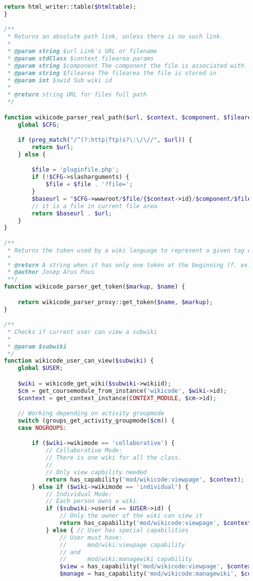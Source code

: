 \begin{lstlisting}[language=PHP]
    return html_writer::table($htmltable);
}

/**
 * Returns an absolute path link, unless there is no such link.
 *
 * @param string $url Link's URL or filename
 * @param stdClass $context filearea params
 * @param string $component The component the file is associated with
 * @param string $filearea The filearea the file is stored in
 * @param int $swid Sub wiki id
 *
 * @return string URL for files full path
 */

function wikicode_parser_real_path($url, $context, $component, $filearea, $swid) {
    global $CFG;

    if (preg_match("/^(?:http|ftp)s?\:\/\//", $url)) {
        return $url;
    } else {

        $file = 'pluginfile.php';
        if (!$CFG->slasharguments) {
            $file = $file . '?file=';
        }
        $baseurl = "$CFG->wwwroot/$file/{$context->id}/$component/$filearea/$swid/";
        // it is a file in current file area
        return $baseurl . $url;
    }
}

/**
 * Returns the token used by a wiki language to represent a given tag or "object" (bold -> **)
 *
 * @return A string when it has only one token at the beginning (f. ex. lists). An array composed by 2 strings when it has 2 tokens, one at the beginning and one at the end (f. ex. italics). Returns false otherwise.
 * @author Josep Arus Pous
 **/
function wikicode_parser_get_token($markup, $name) {

    return wikicode_parser_proxy::get_token($name, $markup);
}

/**
 * Checks if current user can view a subwiki
 *
 * @param $subwiki
 */
function wikicode_user_can_view($subwiki) {
    global $USER;

    $wiki = wikicode_get_wiki($subwiki->wikiid);
    $cm = get_coursemodule_from_instance('wikicode', $wiki->id);
    $context = get_context_instance(CONTEXT_MODULE, $cm->id);

    // Working depending on activity groupmode
    switch (groups_get_activity_groupmode($cm)) {
    case NOGROUPS:

        if ($wiki->wikimode == 'collaborative') {
            // Collaborative Mode:
            // There is one wiki for all the class.
            //
            // Only view capbility needed
            return has_capability('mod/wikicode:viewpage', $context);
        } else if ($wiki->wikimode == 'individual') {
            // Individual Mode:
            // Each person owns a wiki.
            if ($subwiki->userid == $USER->id) {
                // Only the owner of the wiki can view it
                return has_capability('mod/wikicode:viewpage', $context);
            } else { // User has special capabilities
                // User must have:
                //      mod/wiki:viewpage capability
                // and
                //      mod/wiki:managewiki capability
                $view = has_capability('mod/wikicode:viewpage', $context);
                $manage = has_capability('mod/wikicode:managewiki', $context);


\end{lstlisting}
